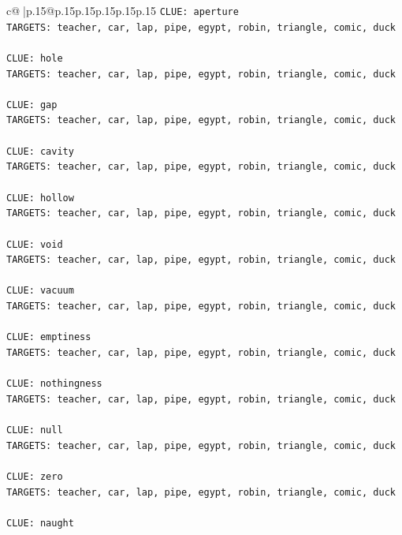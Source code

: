 \documentclass{article}
\begin{document}
{\begin{supertabular}{c@{$\;$}|p{.15\linewidth}@{}p{.15\linewidth}p{.15\linewidth}p{.15\linewidth}p{.15\linewidth}p{.15\linewidth}}
{{{\texttt{CLUE: aperture} \\
\texttt{TARGETS: teacher, car, lap, pipe, egypt, robin, triangle, comic, duck} \\
\\ 
\texttt{CLUE: hole} \\
\texttt{TARGETS: teacher, car, lap, pipe, egypt, robin, triangle, comic, duck} \\
\\ 
\texttt{CLUE: gap} \\
\texttt{TARGETS: teacher, car, lap, pipe, egypt, robin, triangle, comic, duck} \\
\\ 
\texttt{CLUE: cavity} \\
\texttt{TARGETS: teacher, car, lap, pipe, egypt, robin, triangle, comic, duck} \\
\\ 
\texttt{CLUE: hollow} \\
\texttt{TARGETS: teacher, car, lap, pipe, egypt, robin, triangle, comic, duck} \\
\\ 
\texttt{CLUE: void} \\
\texttt{TARGETS: teacher, car, lap, pipe, egypt, robin, triangle, comic, duck} \\
\\ 
\texttt{CLUE: vacuum} \\
\texttt{TARGETS: teacher, car, lap, pipe, egypt, robin, triangle, comic, duck} \\
\\ 
\texttt{CLUE: emptiness} \\
\texttt{TARGETS: teacher, car, lap, pipe, egypt, robin, triangle, comic, duck} \\
\\ 
\texttt{CLUE: nothingness} \\
\texttt{TARGETS: teacher, car, lap, pipe, egypt, robin, triangle, comic, duck} \\
\\ 
\texttt{CLUE: null} \\
\texttt{TARGETS: teacher, car, lap, pipe, egypt, robin, triangle, comic, duck} \\
\\ 
\texttt{CLUE: zero} \\
\texttt{TARGETS: teacher, car, lap, pipe, egypt, robin, triangle, comic, duck} \\
\\ 
\texttt{CLUE: naught} \\
}}}
\end{supertabular}}
\end{document}

